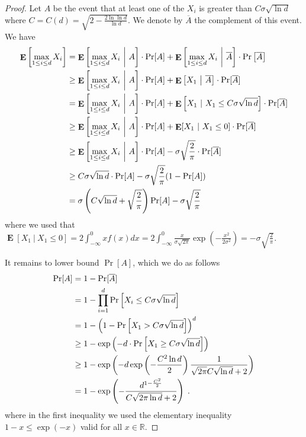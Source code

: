 \documentclass{article}
\DeclareMathOperator*{\Exp}{\mathbf{E}}
\newcommand{\field}[1]{\mathbb{#1}}
\newcommand{\R}{\field{R}}
\begin{document}
\begin{proof}
Let $A$ be the event that at least one of the $X_i$ is greater than $C \sigma
\sqrt{\ln d}$ where $C = C(d) = \sqrt{2 - \frac{2 \ln \ln d}{\ln d}}$. We
denote by $\overline{A}$ the complement of this event. We have
\begin{align}
\Exp \left[ \max_{1 \le i \le d} X_i \right]
& = \Exp \left[ \max_{1 \le i \le d} X_i ~\bigg|~ A \right] \cdot \Pr[A] + \Exp \left[ \max_{1 \le i \le d} X_i ~\bigg|~ \overline{A} \right] \cdot \Pr \left[ \overline{A} \right] \notag \\
& \ge \Exp \left[ \max_{1 \le i \le d} X_i ~\bigg|~ A \right] \cdot \Pr[A] + \Exp \left[ X_1 ~\big|~ \overline{A} \right] \cdot \Pr[\overline{A}] \notag \\
& = \Exp \left[ \max_{1 \le i \le d} X_i~\bigg|~ A \right] \cdot \Pr[A] + \Exp \left[ X_1~|~ X_1 \le C \sigma \sqrt{\ln d} \right] \cdot \Pr[\overline{A}] \notag \\
& \ge \Exp \left[ \max_{1 \le i \le d} X_i~\bigg|~ A \right] \cdot \Pr[A] + \Exp[X_1~|~ X_1 \le 0] \cdot \Pr[\overline{A}] \notag \\
& \ge \Exp \left[ \max_{1 \le i \le d} X_i~\bigg|~ A \right] \cdot \Pr[A] - \sigma \sqrt{\frac{2}{\pi}} \cdot \Pr[\overline{A}] \notag \\
& \ge C \sigma \sqrt{\ln d} \cdot \Pr[A] - \sigma \sqrt{\frac{2}{\pi}} (1 - \Pr[A]) \notag \\
& = \sigma \left(C\sqrt{\ln d} + \sqrt{\frac{2}{\pi}}\right) \Pr[A] -  \sigma \sqrt{\frac{2}{\pi}} \label{equation:maximum-of-gaussians-lower-bound-3}
\end{align}
where we used that $\Exp[X_1 ~|~ X_1 \le 0] = 2 \int_{-\infty}^0 x f(x) dx = 2 \int_{-\infty}^0 \frac{x}{\sigma \sqrt{2\pi}} \exp \left(- \frac{x^2}{2\sigma^2} \right) = - \sigma \sqrt{\frac{2}{\pi}}$.

It remains to lower bound $\Pr[A]$, which we do as follows
\begin{align}
\Pr[A]
& = 1 - \Pr[\overline{A}] \notag \\
& = 1 - \prod_{i=1}^d \Pr \left[ X_i \le C \sigma \sqrt{\ln d} \right]  \notag \\
& = 1 - \left(1 - \Pr\left[ X_1 > C \sigma \sqrt{\ln d} \right] \right)^d \notag \\
& \ge 1 - \exp\left(-d \cdot \Pr\left[X_1 \ge C \sigma \sqrt{\ln d} \right]\right) \notag \\
& \ge 1 - \exp\left(-d \exp\left(-\frac{C^2 \ln d}{2}\right) \frac{1}{\sqrt{2\pi}C \sqrt{\ln d}+2} \right) \notag \\
& = 1 - \exp\left(-\frac{d^{1-\frac{C^2}{2}}}{C \sqrt{2\pi \ln d}+2}\right) \label{equation:maximum-of-gaussians-lower-bound-4} \; .
\end{align}
where in the first inequality we used the elementary inequality $1 - x \le \exp(-x)$ valid for all $x \in \R$.


\end{proof}
\end{document}
